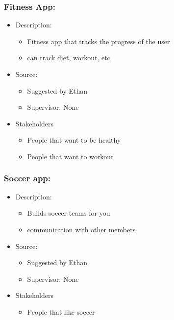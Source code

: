 \documentclass{article}
\begin{document}
\subsubsection*{Fitness App:}
\label{subsec:fitness}
\begin{itemize}
    \item Description:
    \begin{itemize}
        \item Fitness app that tracks the progress of the user
        \item can track diet, workout, etc.
    \end{itemize}
    \item Source:
    \begin{itemize}
        \item Suggested by Ethan
        \item Supervisor: None
    \end{itemize}
    \item Stakeholders
    \begin{itemize}
        \item People that want to be healthy
        \item People that want to workout
    \end{itemize}
\end{itemize}

\subsubsection*{Soccer app:}
\label{subsec:soccer}
\begin{itemize}
    \item Description:
    \begin{itemize}
        \item Builds soccer teams for you
        \item communication with other members
    \end{itemize}
    \item Source:
    \begin{itemize}
        \item Suggested by Ethan
        \item Supervisor: None
    \end{itemize}
    \item Stakeholders
    \begin{itemize}
        \item People that like soccer
    \end{itemize}
\end{itemize}
\end{document}
